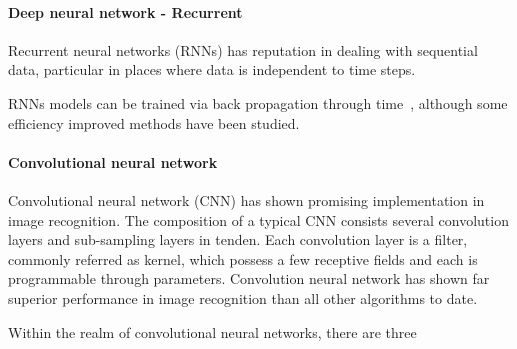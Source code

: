 \paragraph{Deep neural network - Recurrent}
Recurrent neural networks (RNNs) has reputation in dealing with sequential data, particular in places where data is independent to time steps. 

RNNs models can be trained via back propagation through time~\cite{Goodfellow-et-al-2016}, although some efficiency improved methods have been studied.~\cite{963769,neco.1989,Gomez:2008:ANE:1390681.1390712}

\paragraph{Convolutional neural network}
Convolutional neural network (CNN) has shown promising implementation in image recognition. The composition of a typical CNN consists several convolution layers and sub-sampling layers in tenden. Each convolution layer is a filter, commonly referred as kernel, which possess a few receptive fields and each is programmable through parameters.  
Convolution neural network has shown far superior performance in image recognition than all other algorithms to date.~\cite{Szegedy_2015}
\par 
Within the realm of convolutional neural networks, there are three